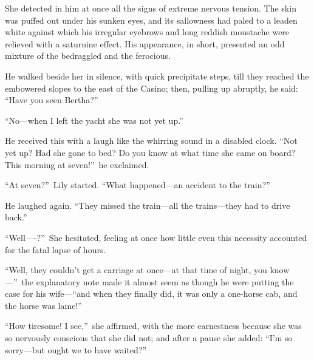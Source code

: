 \documentclass[12pt,a4paper]{book}
\begin{document}
She detected in him at once all the signs of extreme nervous
tension. The skin was puffed out under his sunken eyes, and its
sallowness had paled to a leaden white against which his
irregular eyebrows and long reddish moustache were relieved with
a saturnine effect. His appearance, in short, presented an odd
mixture of the bedraggled and the ferocious.





He walked beside her in silence, with quick precipitate steps,
till they reached the embowered slopes to the east of the Casino;
then, pulling up abruptly, he said: ``Have you seen Bertha?''





``No---when I left the yacht she was not yet up.''





He received this with a laugh like the whirring sound in a
disabled clock. ``Not yet up? Had she gone to bed? Do you know at
what time she came on board? This morning at seven!''\ he
exclaimed.





``At seven?''\ Lily started. ``What happened---an accident to the
train?''





He laughed again. ``They missed the train---all the trains---they
had to drive back.''





``Well----?''\ She hesitated, feeling at once how little even this
necessity accounted for the fatal lapse of hours.





``Well, they couldn't get a carriage at once---at that time of
night, you know---''\ the explanatory note made it almost
seem as though he were putting the case for his wife---``and when
they finally did, it was only a one-horse cab, and the horse was
lame!''





``How tiresome! I see,''\ she affirmed, with the more earnestness
because she was so nervously conscious that she did not; and
after a pause she added: ``I'm so sorry---but ought we to have
waited?''
\end{document}
